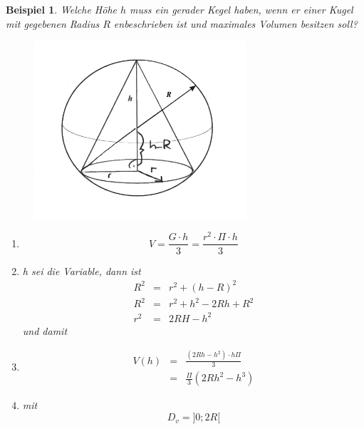 \documentclass[a4paper,10pt]{report}
\newtheorem{myexample}{Beispiel}
\begin{document}
\newpage
\begin{myexample}
	Welche Höhe $h$ muss ein gerader Kegel haben, wenn er einer Kugel mit gegebenen Radius $R$ enbeschrieben ist und maximales Volumen besitzen soll?\\
	\begin{figure}[H]
			\centering
			\includegraphics[width=0.7\textwidth]{images/extremalwertproblem2.png}
	\end{figure}
	\begin{enumerate}
		\item
		\begin{equation*}V = \frac{G\cdot h}{3}= \frac{r^2\cdot \Pi \cdot h}{3}\end{equation*}
		\item
		h sei die Variable, dann ist
		\begin{eqnarray*}
			R^2 &=& r^2 + (h-R)^2\\
			R^2 &=& r^2 + h^2 -2Rh+ R^2\\
			r^2 &=& 2RH-h^2
		\end{eqnarray*}
		und damit
		\item
		\begin{eqnarray*}
			V(h)&=& \frac{(2Rh-h^2)\cdot h\Pi}{3}\\
			&=& \frac{\Pi}{3}(2Rh^2-h^3)
		\end{eqnarray*}
		\item
		mit 
		\begin{equation*}D_v = ]0;2R[\end{equation*}
		

\end{enumerate}
\end{myexample}
\end{document}
